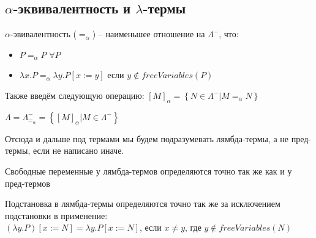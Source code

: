\subsection{$\alpha$-эквивалентность и $\lambda$-термы}
\label{sec-2-2}
\begin{definition}
$\alpha$-эвивалентность ($=_\alpha$) -- наименьшее отношение на $\Lambda^-$,
что:
\begin{itemize}
\item $P =_\alpha P$ $\forall P$
\item $\lambda x . P =_\alpha \lambda y . P [x:=y]$ если $y \not \in freeVariables(P)$
\end{itemize}
Также введём следующую операцию: $[M]_\alpha = \left\{ N \in \Lambda^- | M =_\alpha N \right\}$
\end{definition}
\begin{definition}
$\Lambda = \Lambda^-_{=_\alpha} = \left\{ [M]_\alpha | M \in \Lambda^- \right\}$
\end{definition}
Отсюда и дальше под термами мы будем подразумевать лямбда-термы, а не 
пред-термы, если не написано иначе.
\begin{definition}
Свободные переменные у лямбда-термов определяются точно так же
как и у пред-термов
\end{definition}
\begin{definition}
Подстановка в лямбда-термы определяются точно так же за исключением
подстановки в применение: \\
$(\lambda y . P)[x:=N] = \lambda y . P[x:= N]$, если $x \not= y$,
где $y \not \in freeVariables(N)$
\end{definition}
